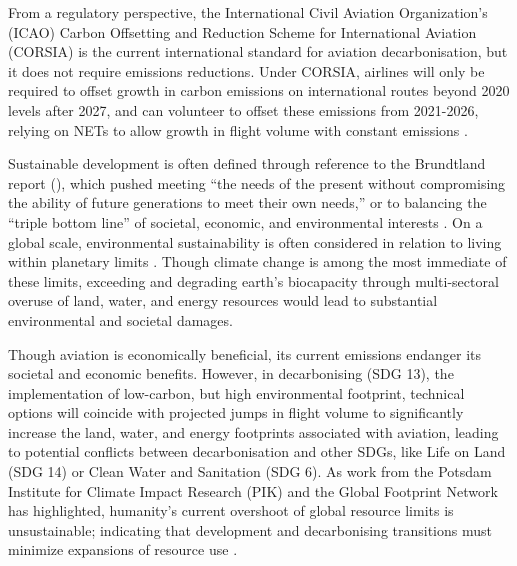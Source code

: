 \documentclass{article}
\begin{document}
From a regulatory perspective, the International Civil Aviation Organization’s (ICAO) Carbon Offsetting and Reduction Scheme for International Aviation (CORSIA) is the current international standard for aviation decarbonisation, but it does not require emissions reductions. Under CORSIA, airlines will only be required to offset growth in carbon emissions on international routes beyond 2020 levels after 2027, and can volunteer to offset these emissions from 2021-2026, relying on NETs to allow growth in flight volume with constant emissions \citep{icao_2_2021}. \par
Sustainable development is often defined through reference to the Brundtland report (\citeyear{keeble_brundtland_1988}), which pushed meeting “the needs of the present without compromising the ability of future generations to meet their own needs,” or to balancing the “triple bottom line” of societal, economic, and environmental interests \citep{elkington_towards_1994}. On a global scale, environmental sustainability is often considered in relation to living within planetary limits \citep{lin_ecological_2018,meadows_limits_2004}. Though climate change is among the most immediate of these limits, exceeding and degrading earth’s biocapacity through multi-sectoral overuse of land, water, and energy resources would lead to substantial environmental and societal damages. \par
Though aviation is economically beneficial, its current emissions endanger its societal and economic benefits. However, in decarbonising (SDG 13), the implementation of low-carbon, but high environmental footprint, technical options will coincide with projected jumps in flight volume to significantly increase the land, water, and energy footprints associated with aviation, leading to potential conflicts between decarbonisation and other SDGs, like Life on Land (SDG 14) or Clean Water and Sanitation (SDG 6). As work from the Potsdam Institute for Climate Impact Research (PIK) and the Global Footprint Network has highlighted, humanity’s current overshoot of global resource limits is unsustainable; indicating that development and decarbonising transitions must minimize expansions of resource use \citep{holmatov_land_2019}.\par
\end{document}
